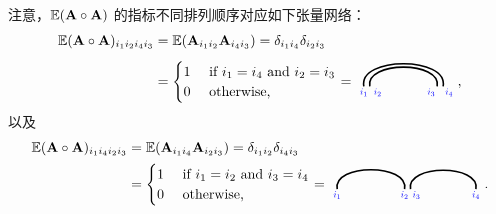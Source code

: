 \begin{remark}
    注意，$\mathbb{E}(\mathbf{A}\circ\mathbf{A})$ 的指标不同排列顺序对应如下张量网络：  
    \begin{align*}
            \EE(\Ab\outprod\Ab)_{i_1i_2i_4i_3}
            &= 
            \EE(\Ab_{i_1i_2}\Ab_{i_4i_3}) 
    = \delta_{i_1i_4}\delta_{i_2i_3}\\
    &=
    \begin{cases}
        1 & \text{ if } i_1=i_4\text{ and } i_2=i_3\\
        0 & \text{ otherwise, }
    \end{cases} 
    =
    \begin{tikzpicture}[baseline=\baseline]
    \tikzset{tensor/.style = {minimum size = 0.5cm,shape = circle,thick,draw=black,inner sep = 0pt}, edge/.style = {thick,line width=.4mm},every loop/.style={}}
    \def\y{0}
    \def\x{0}
    \draw[edge] (\x,\y-0.1) to [out=100,in=80] (\x+2,\y-0.1);
    \draw[edge] (\x+0.15,\y-0.1) to [out=100,in=80] (\x+1.85,\y-0.1);
    \node[draw=none] () at (\x,\y-0.25) {\scalebox{0.7}{\indcolor{$i_1$}}};
    \node[draw=none] () at (\x+2.15,\y-0.25) {\scalebox{0.7}{\indcolor{$i_4$}}};
    \node[draw=none] () at (\x+0.35,\y-0.25) {\scalebox{0.7}{\indcolor{$i_2$}}};
    \node[draw=none] () at (\x+1.7,\y-0.25) {\scalebox{0.7}{\indcolor{$i_3$}}};
\end{tikzpicture},
    \end{align*}
以及
\begin{align*}
\EE(\Ab\outprod\Ab)_{i_1i_4i_2i_3} 
&= 
\EE(\Ab_{i_1i_4}\Ab_{i_2i_3})= \delta_{i_1i_2}\delta_{i_4i_3}\\
&=
\begin{cases}
        1 & \text{ if } i_1=i_2\text{ and } i_3=i_4\\
        0 & \text{ otherwise, }
\end{cases}
=
\begin{tikzpicture}[baseline=\baseline]
    \tikzset{tensor/.style = {minimum size = 0.5cm,shape = circle,thick,draw=black,inner sep = 0pt}, edge/.style = {thick,line width=.4mm},every loop/.style={}}
    \def\y{0}
    \def\x{0}
    \draw[edge] (\x+0.15,\y-0.1) to [out=100,in=80] (\x+1.85,\y-0.1);
    \draw[edge] (\x+2,\y-0.1) to [out=100,in=80] (\x+3.65,\y-0.1);
    \node[draw=none] () at (\x+0.15,\y-0.25) {\scalebox{0.7}{\indcolor{$i_1$}}};
    \node[draw=none] () at (\x+1.85,\y-0.25) {\scalebox{0.7}{\indcolor{$i_2$}}};
    \node[draw=none] () at (\x+2.15,\y-0.25) {\scalebox{0.7}{\indcolor{$i_3$}}};
    \node[draw=none] () at (\x+3.65,\y-0.25) {\scalebox{0.7}{\indcolor{$i_4$}}};
\end{tikzpicture}.
\end{align*}
\end{remark}
